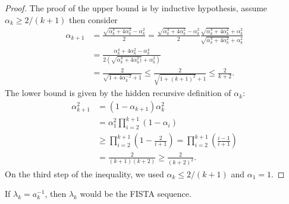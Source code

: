 \documentclass[12pt]{article}
\begin{document}
    \begin{proof}
        The proof of the upper bound is by inductive hypothesis, assume $\alpha_k \ge 2/(k + 1)$ then consider
        \begin{align*}
            \alpha_{k + 1} &= 
            \frac{\sqrt{\alpha_k^4 + 4 \alpha_k^2} - \alpha_k^2}{2}
            = 
            \frac{\sqrt{\alpha_k^4 + 4 \alpha_k^2} - \alpha_k^2}{2}
            \frac{\sqrt{\alpha_k^4 + 4 \alpha_k^2} + \alpha_k^2}{\sqrt{\alpha_k^4 + 4 \alpha_k^2} + \alpha_k^2}
            \\
            &= \frac{\alpha_k^4 + 4\alpha_k^2 - \alpha_k^4}{2(\sqrt{\alpha_k^4 + 4 \alpha_k^2)} + \alpha_k^2)}
            \\
            &= \frac{2}{\sqrt{1 + 4 \alpha_k^{-2}} + 1} 
            \le \frac{2}{\sqrt{1 + (k + 1)^2} + 1} \le \frac{2}{k + 2}. 
        \end{align*}
        The lower bound is given by the hidden recursive definition of $\alpha_k$: 
        \begin{align*}
            \alpha_{k + 1}^2 &= (1 - \alpha_{k + 1})\alpha_k^2 
            \\
            &= \alpha_1^2 \prod_{i = 2}^{k + 1}(1 - \alpha_i)
            \\
            &\ge \prod_{i = 2}^{k + 1}\left(
                1 - \frac{2}{i + 1}
            \right) = \prod_{i = 2}^{k + 1} \left(\frac{i - 1}{i + 1}\right)
            \\
            &= \frac{2}{(k + 1)(k + 2)}  \ge \frac{2}{(k + 2)^2}. 
        \end{align*}
        On the third step of the inequality, we used $\alpha_k \le 2/(k + 1)$ and $\alpha_1 = 1$. 
    \end{proof}
    \begin{remark}
        If $ \lambda_k = a_k^{-1}$, then $\lambda_k$ would be the FISTA sequence. 
    \end{remark}
\end{document}
